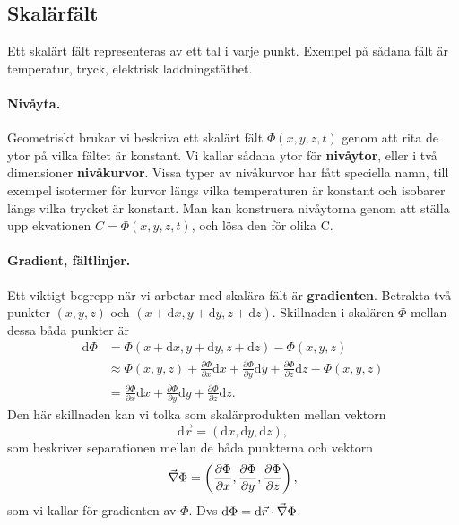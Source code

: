 \documentclass[%
oneside,                 %
final,                   %
10pt]{article}
\begin{document}
\subsection{Skalärfält}

Ett skalärt fält representeras av ett tal i varje punkt.  Exempel på sådana fält är temperatur, tryck, elektrisk laddningstäthet. 

\paragraph{Nivåyta.}
Geometriskt brukar vi beskriva ett skalärt fält $\Phi(x,y,z,t)$ genom  att rita de ytor på vilka fältet är konstant.  Vi kallar sådana ytor för \textbf{nivåytor}, eller i två dimensioner \textbf{nivåkurvor}.  Vissa typer av nivåkurvor har fått speciella namn, till exempel isotermer för kurvor längs vilka temperaturen är konstant och isobarer längs vilka trycket är konstant.  Man kan konstruera nivåytorna genom att ställa upp  ekvationen $C = \Phi(x,y,z,t)$, och lösa den för olika C.

\paragraph{Gradient, fältlinjer.}
Ett viktigt begrepp när vi arbetar med skalära fält är \textbf{gradienten}. Betrakta två punkter $(x,y,z)$ och $(x+\mbox{d}x,y+\mbox{d}y,z+\mbox{d}z)$. Skillnaden i skalären $\Phi$ mellan dessa båda punkter är
\begin{align}
  \mbox{d}\Phi &= \Phi\left(x+\mbox{d}x, y+\mbox{d}y,z+\mbox{d}z\right) - \Phi\left(x,y,z\right) \nonumber \\ 
& \approx \Phi\left(x,y,z\right) + \frac{\partial \Phi}{\partial x}\mbox{d}x
+ \frac{\partial \Phi}{\partial y}\mbox{d}y + \frac{\partial \Phi}{\partial z}
\mbox{d}z - \Phi\left(x,y,z\right) \nonumber \\ 
& = \frac{\partial \Phi}{\partial x}\mbox{d}x
+ \frac{\partial \Phi}{\partial y}\mbox{d}y + \frac{\partial \Phi}{\partial z}
\mbox{d}z.
\end{align}
Den här skillnaden kan vi tolka som skalärprodukten mellan vektorn 
\begin{equation}
  \mbox{d}\vec{r} = \left(\mbox{d}x,\mbox{d}y,\mbox{d}z\right), 
\end{equation}
som beskriver separationen mellan de båda punkterna och vektorn
\begin{equation}
  \vec{\nabla} \Phi = \left(\frac{\partial \Phi}{\partial x}, 
\frac{\partial \Phi}{\partial y}, \frac{\partial \Phi}{\partial z}\right),
\end{equation}
som vi kallar för gradienten av $\Phi$. Dvs $\mbox{d}\Phi = \mbox{d}\vec{r} \cdot \vec{\nabla} \Phi$.
\end{document}
